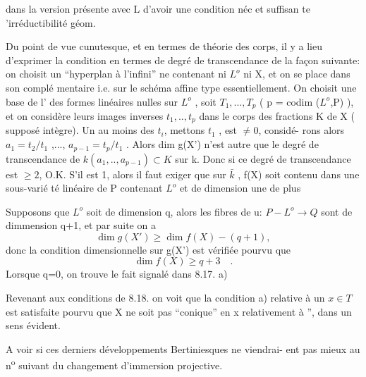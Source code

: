 
dans la version présente  avec L d'avoir une condition néc et suffisan%
te 'irréductibilité géom. 

Du point de vue cunutesque,  et en termes de théorie des
corps, il y a lieu d'exprimer la condition  en termes de
degré de transcendance de la façon suivante: on choisit un ``hyperplan
à l'infini'' ne contenant ni $L^{o}$ ni X, et on se place dans son complé%
mentaire i.e. sur le schéma affine  type essentiellement. On choisit
une base de l' des formes linéaires nulles sur $L^{o}$ , 
 soit $T_{1},\ldots,T_{p}$ ( p = codim ($L^{o}$,P) ), et on considère
leurs images inverses $t_{1},..,t_{p}$ dans le corps des fractions K de X
( supposé intègre). Un au moins des $t_{i}$, mettons $t_{1}$ , est $\neq 0$, considé-%
rons alors $a_{1} = t_{2}/t_{1}$ ,..., $a_{p-1} = t_{p}/t_{1}$ . Alors dim g(X') n'est
autre que le degré de transcendance de $k(a_{1},..,a_{p-1}) \subset K$ sur k. Donc
si ce degré de transcendance est $\geqslant 2$, O.K.  S'il est 1,
alors il faut exiger que sur $\bar{k}$ , f(X) soit contenu dans une sous-varié%
té linéaire de P contenant $L^{o}$ et de dimension une de plus

Supposons que $L^{o}$ soit de dimension q, alors les fibres de u:
$P - L^{o} \to Q$ sont de dimmension q+1,  et par suite on a
\[ \dim g(X') \geqslant \dim f(X) - (q+1) , \]
donc la condition dimensionnelle sur g(X') est vérifiée pourvu que
\[ \dim f(X) \geqslant q+3 \quad . \]
Lorsque q=0, on trouve le fait signalé dans 8.17. a)\unsure{,}  

Revenant aux conditions de 8.18. on voit que la condition a)
relative à un $x \in T$ est satisfaite pourvu que X ne soit pas ``conique''
en x relativement à '', dans un sens évident.

\margin{|} A voir si ces derniers développements Bertiniesques ne viendrai-%
ent pas mieux au n\textsuperscript{o} suivant du changement d'immersion projective. 

